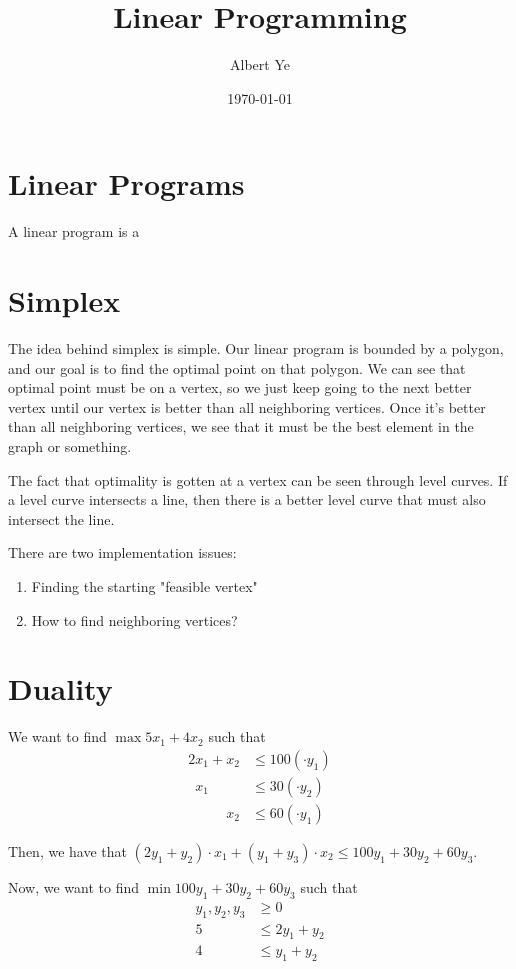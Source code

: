 \documentclass{article}
\title{Linear Programming}
\author{Albert Ye}
\date{\today}
\begin{document}
\maketitle
\section{Linear Programs}
A linear program is a 

\section{Simplex}
The idea behind simplex is simple. Our linear program is bounded by a polygon, and our goal is to find the optimal point on that polygon. We can see that optimal point must be on a vertex, so we just keep going to the next better vertex until our vertex is better than all neighboring vertices. Once it's better than all neighboring vertices, we see that it must be the best element in the graph or something.

The fact that optimality is gotten at a vertex can be seen through level curves. If a level curve intersects a line, then there is a better level curve that must also intersect the line.

There are two implementation issues:
\begin{enumerate}
    \item Finding the starting "feasible vertex"
    \item How to find neighboring vertices?
\end{enumerate}

\section{Duality}
We want to find $\max 5x_1 + 4x_2$ such that 
\begin{align*}
    2x_1 + x_2 &\leq 100 (\cdot y_1) \\
    \phantom{2}x_1 \phantom{+ x_2} &\leq 30 (\cdot y_2) \\
    \phantom{2x_1 +} x_2 &\leq 60 (\cdot y_1)
\end{align*}

Then, we have that $(2y_1+y_2) \cdot x_1 + (y_1 + y_3) \cdot x_2 \leq 100y_1 + 30y_2 + 60y_3$.

Now, we want to find $\min 100y_1 + 30y_2 + 60y_3$ such that
\begin{align*}
    y_1, y_2, y_3 &\geq 0 \\
    5 &\leq 2y_1 + y_2 \\
    4 &\leq y_1 + y_2
\end{align*}
\end{document}

